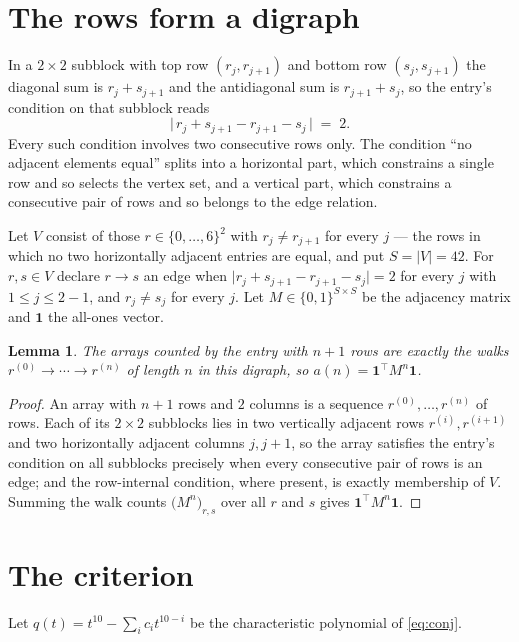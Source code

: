 \documentclass[11pt,a4paper]{article}
\theoremstyle{plain}
\newtheorem{lemma}[theorem]{Lemma}
\theoremstyle{definition}
\begin{document}
\section{The rows form a digraph}

In a $2\times2$ subblock with top row $(r_j,r_{j+1})$ and bottom row $(s_j,s_{j+1})$ the
diagonal sum is $r_j+s_{j+1}$ and the antidiagonal sum is $r_{j+1}+s_j$, so the entry's
condition on that subblock reads
\[
\bigl|\,r_j+s_{j+1}-r_{j+1}-s_j\,\bigr|\;=\;2.
\]
Every such condition involves two consecutive rows only. The condition ``no adjacent elements equal'' splits into a horizontal
part, which constrains a single row and so selects the vertex set, and a vertical part,
which constrains a consecutive pair of rows and so belongs to the edge relation.

Let $V$ consist of those $r\in\{0,\dots,6\}^{2}$ with $r_j\ne r_{j+1}$ for every
$j$ --- the rows in which no two horizontally adjacent entries are equal, and put $S=|V|=42$. For $r,s\in V$ declare $r\to s$ an edge
when $\bigl|r_j+s_{j+1}-r_{j+1}-s_j\bigr|=2$ for every $j$ with
$1\le j\le2-1$, and $r_j\ne s_j$ for every $j$. Let $M\in\{0,1\}^{S\times S}$ be the adjacency matrix and $\mathbf{1}$
the all-ones vector.

\begin{lemma}\label{lem:walk}
The arrays counted by the entry with $n+1$ rows are exactly the walks
$r^{(0)}\to\cdots\to r^{(n)}$ of length $n$ in this digraph, so
$a(n)=\mathbf{1}^{\!\top}M^{n}\mathbf{1}$.
\end{lemma}

\begin{proof}
An array with $n+1$ rows and $2$ columns is a sequence $r^{(0)},\dots,r^{(n)}$ of
rows. Each of its $2\times2$ subblocks lies in two vertically adjacent rows
$r^{(i)},r^{(i+1)}$ and two horizontally adjacent columns $j,j+1$, so the array satisfies
the entry's condition on all subblocks precisely when every consecutive pair of rows is an
edge; and the row-internal condition, where present, is exactly membership of $V$. Summing
the walk counts $\bigl(M^{n}\bigr)_{r,s}$ over all $r$ and $s$ gives
$\mathbf{1}^{\!\top}M^{n}\mathbf{1}$.
\end{proof}

\section{The criterion}

Let $q(t)=t^{10}-\sum_i c_i t^{10-i}$ be the characteristic polynomial of
\eqref{eq:conj}.
\end{document}

